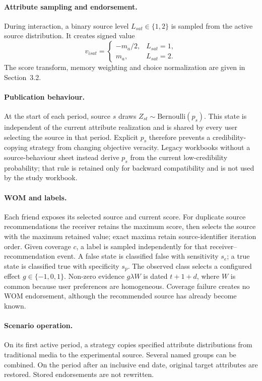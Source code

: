 \paragraph{Attribute sampling and endorsement.} During interaction, a binary source level $L_{sat}\in\{1,2\}$ is sampled from the active source distribution. It creates signed value
\begin{equation}
v_{isat}=\begin{cases}-m_a/2,&L_{sat}=1,\\m_a,&L_{sat}=2.\end{cases}
\end{equation}
The score transform, memory weighting and choice normalization are given in Section~3.2.

\paragraph{Publication behaviour.} At the start of each period, source $s$ draws $Z_{st}\sim\mathrm{Bernoulli}(p_s)$. This state is independent of the current attribute realization and is shared by every user selecting the source in that period. Explicit $p_s$ therefore prevents a credibility-copying strategy from changing objective veracity. Legacy workbooks without a source-behaviour sheet instead derive $p_s$ from the current low-credibility probability; that rule is retained only for backward compatibility and is not used by the study workbook.

\paragraph{WOM and labels.} Each friend exposes its selected source and current score. For duplicate source recommendations the receiver retains the maximum score, then selects the source with the maximum retained value; exact maxima retain source-identifier iteration order. Given coverage $c$, a label is sampled independently for that receiver--recommendation event. A false state is classified false with sensitivity $s_e$; a true state is classified true with specificity $s_p$. The observed class selects a configured effect $g\in\{-1,0,1\}$. Non-zero evidence $g\lambda W$ is dated $t+1+d$, where $W$ is common because user preferences are homogeneous. Coverage failure creates no WOM endorsement, although the recommended source has already become known.

\paragraph{Scenario operation.} On its first active period, a strategy copies specified attribute distributions from traditional media to the experimental source. Several named groups can be combined. On the period after an inclusive end date, original target attributes are restored. Stored endorsements are not rewritten.

